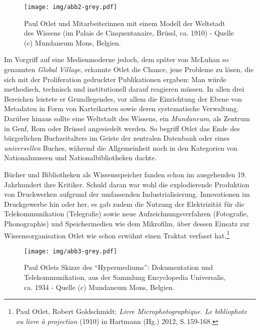 \begin{figure}[htbp]
\centering
\texttt{[image: img/abb2-grey.pdf]}
\caption*{Paul Otlet und Mitarbeiterinnen mit einem Modell der Weltstadt
des Wissens (im Palais de Cinquentanaire, Brüssl, ca. 1910) - Quelle (c)
Mundaneum Mons, Belgien.}
\end{figure}

Im Vorgriff auf eine Medienmoderne jedoch, dem später von McLuhan so
genannten \emph{Global Village}, erkannte Otlet die Chance, jene
Probleme zu lösen, die sich mit der Proliferation gedruckter
Publikationen ergaben: Man würde methodisch, technisch und
institutionell darauf reagieren müssen. In allen drei Bereichen leistete
er Grundlegendes, vor allem die Einrichtung der Ebene von Metadaten in
Form von Karteikarten sowie deren systematische Verwaltung. Darüber
hinaus sollte eine Weltstadt des Wissens, ein \emph{Mundaneum}, als
Zentrum in Genf, Rom oder Brüssel angesiedelt werden. So begriff Otlet
das Ende des bürgerlichen Buchzeitalters im Geiste der zentralen
Datenbank oder eines \emph{universellen} Buches, während die
Allgemeinheit noch in den Kategorien von Nationalmuseen und
Nationalbibliotheken dachte.

Bücher und Bibliotheken als Wissensspeicher fanden schon im ausgehenden
19. Jahrhundert ihre Kritiker. Schuld daran war wohl die explodierende
Produktion von Druckwerken aufgrund der umfassenden Industrialisierung.
Innovationen im Druckgewerbe hin oder her, es gab zudem die Nutzung der
Elektrizität für die Telekommunikation (Telegrafie) sowie neue
Aufzeichnungsverfahren (Fotografie, Phonographie) und Speichermedien wie
dem Mikrofilm, über dessen Einsatz zur Wissensorganisation Otlet wie
schon erwähnt einen Traktat verfasst hat.\footnote{Paul Otlet, Robert
  Goldschmidt: \emph{Livre Microphotographique. Le bibliophote ou livre
  à projection} (1910) in Hartmann (Hg.) 2012, S.\,159-168.}

\begin{figure}[htbp]
\centering
\texttt{[image: img/abb3-grey.pdf]}
\caption*{Paul Otlets Skizze des \enquote{Hypermediums}: Dokumentation
und Telekommunikation, aus der Sammlung Encyclopedia Universalis, ca.
1934 - Quelle (c) Mundaneum Mons, Belgien.}
\end{figure}

